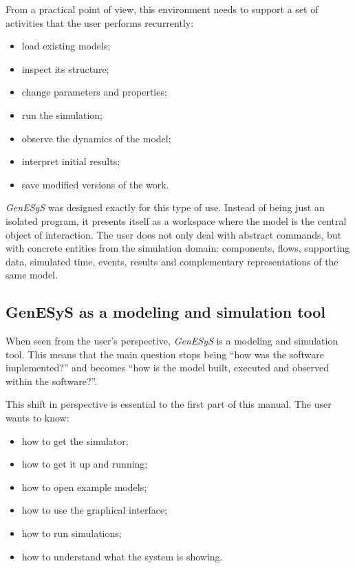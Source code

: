 From a practical point of view, this environment needs to support a set of activities that the user performs recurrently:

\begin{itemize}
\item load existing models;
\item inspect its structure;
\item change parameters and properties;
\item run the simulation;
\item observe the dynamics of the model;
\item interpret initial results;
\item save modified versions of the work.
\end{itemize}

\textit{GenESyS} was designed exactly for this type of use. Instead of being just an isolated program, it presents itself as a workspace where the model is the central object of interaction. The user does not only deal with abstract commands, but with concrete entities from the simulation domain: components, flows, supporting data, simulated time, events, results and complementary representations of the same model.

\subsection{GenESyS as a modeling and simulation tool}
\label{subsec:cap1_genesys_ferramenta}

When seen from the user's perspective, \textit{GenESyS} is a modeling and simulation tool. This means that the main question stops being ``how was the software implemented?'' and becomes ``how is the model built, executed and observed within the software?''.

This shift in perspective is essential to the first part of this manual. The user wants to know:
\begin{itemize}
\item how to get the simulator;
\item how to get it up and running;
\item how to open example models;
\item how to use the graphical interface;
\item how to run simulations;
\item how to understand what the system is showing.
\end{itemize}


